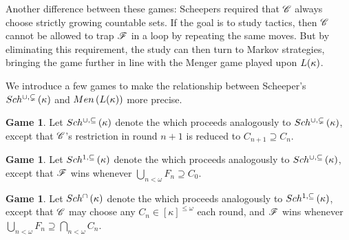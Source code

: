 \documentclass{amsart}
\theoremstyle{definition}
\newtheorem{game}[theorem]{Game}
\begin{document}
Another difference between these games:
Scheepers required that \(\mathscr{C}\) always choose strictly
growing countable sets. If the goal is to study tactics,
then \(\mathscr{C}\) cannot be allowed to trap \(\mathscr{F}\) in a loop by
repeating the same
moves. But by eliminating this requirement, the study can then turn to Markov
strategies, bringing the game further in line with the Menger game played upon
\(L(\kappa)\).

We introduce a few games to make the relationship between Scheeper's
\(Sch^{\cup,\subsetneq}\left({\kappa}\right)\) and \(Men\left({L(\kappa)}\right)\) more precise.

\begin{game}
  Let \(Sch^{\cup,\subseteq}\left({\kappa}\right)\) denote the
   which proceeds analogously
  to \(Sch^{\cup,\subsetneq}\left({\kappa}\right)\), except that \(\mathscr{C}\)'s restriction in round \(n+1\)
  is reduced to \(C_{n+1}\supseteq C_n\).
\end{game}

\begin{game}
  Let \(Sch^{1,\subseteq}\left({\kappa}\right)\) denote the
   which proceeds analogously
  to \(Sch^{\cup,\subseteq}\left({\kappa}\right)\), except that \(\mathscr{F}\) wins whenever
  \(\bigcup_{n<\omega}F_n\supseteq C_0\).
\end{game}

\begin{game}
  Let \(Sch^{\cap}\left({\kappa}\right)\) denote the
   which proceeds analogously
  to \(Sch^{1,\subseteq}\left({\kappa}\right)\), except that \(\mathscr{C}\) may choose any
  \(C_n\in[\kappa]^{\leq\omega}\) each round, and \(\mathscr{F}\) wins whenever
  \(\bigcup_{n<\omega}F_n\supseteq\bigcap_{n<\omega}C_n\).
\end{game}

%
%
\end{document}

